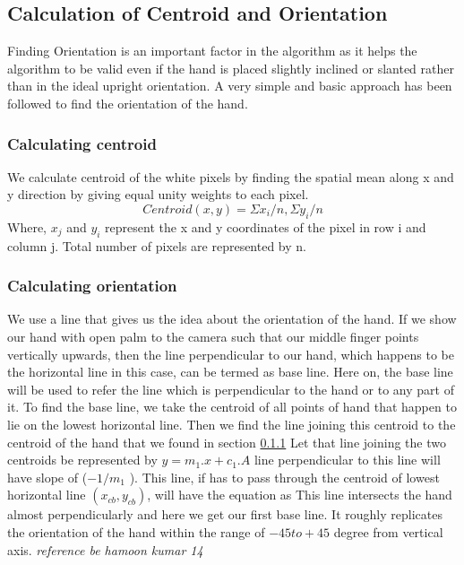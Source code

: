 \documentclass{report}
\begin{document}
\subsection{Calculation of Centroid and Orientation}
Finding Orientation is an important factor in the algorithm as it helps the algorithm to be valid
even if the hand is placed slightly inclined or slanted rather than in the ideal upright orientation. A very simple and basic approach has been followed to find the orientation of the hand. 
\subsubsection{Calculating centroid} \label{sssec:cc}
We calculate centroid of the white pixels by finding the spatial mean along x and y direction by
giving equal unity weights to each pixel.
$$ Centroid(x, y) = \Sigma x_i / n, \Sigma y_i / n  $$
Where, $x_j$ and $y_i$ represent the x and y coordinates of the pixel in row i and column j. Total
number of pixels are represented by n.
\subsubsection{Calculating orientation}
We use a line that gives us the idea about the orientation of the hand. If we show our hand with
open palm to the camera such that our middle finger points vertically upwards, then the line
perpendicular to our hand, which happens to be the horizontal line in this case, can be termed as
base line. Here on, the base line will be used to refer the line which is perpendicular to the hand or to any part of it. \newline
To find the base line, we take the centroid of all points of hand that happen to lie on the lowest
horizontal line. Then we find the line joining this centroid to the centroid of the hand that we
found in section \ref{sssec:cc} Let that line joining the two centroids be represented by $y = m_1.x + c_1.A$
line perpendicular to this line will have slope of ($-1/m_1$ ). This line, if has to pass through the
centroid of lowest horizontal line $(x_{cb} , y_{cb} )$, will have the equation as
This line intersects the hand almost perpendicularly and here we get our first base line. It roughly
replicates the orientation of the hand within the range of $-45 to +45$ degree from vertical axis.  \textit{reference be hamoon kumar 14}
\end{document}
